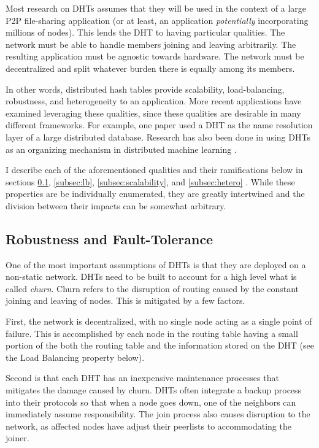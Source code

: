 \documentclass[10pt,letterpaper,twoside]{report}
\begin{document}
Most research on DHTs assumes that they will be used in the context of a large P2P file-sharing application  (or at least, an application \textit{potentially} incorporating millions of nodes).
This lends the DHT to having particular qualities.
The network must be able to handle members joining and leaving arbitrarily.
The resulting application must be agnostic towards hardware.
The network must be decentralized and split whatever burden there is equally among its members.

In other words, distributed hash tables provide scalability, load-balancing, robustness, and heterogeneity to an application.
More recent applications have examined leveraging these qualities, since these qualities are desirable in many different frameworks.
For example, one paper \cite{Mateescu2011440} used a DHT as the name resolution layer of a large distributed database.
Research has also been done in using DHTs as an organizing mechanism in distributed machine learning \cite{liparameter}. 


I describe each of the aforementioned qualities and their ramifications below in sections \ref{subsec:ft}, \ref{subsec:lb}, \ref{subsec:scalability}, and \ref{subsec:hetero} .
While these properties are  be individually enumerated, they are greatly intertwined and the division between their impacts can be somewhat arbitrary.

\subsection{Robustness and Fault-Tolerance}
\label{subsec:ft}
One of the most important assumptions of DHTs is that they are deployed on a non-static network.
DHTs need to be built to account for a high level what is called \textit{churn}.  
Churn refers to the disruption of routing caused by the constant joining and leaving of nodes.
This is mitigated by a few factors.

First, the network is decentralized, with no single node acting as a single point of failure.
This is accomplished by each node in the routing table having a small portion of the both the routing table and the information stored on the DHT (see the Load Balancing property below).

Second is that each DHT has an inexpensive maintenance processes that mitigates the damage caused by churn.
DHTs often integrate a backup process into their protocols so that when a node goes down, one of the neighbors can immediately assume responsibility.
The join process also causes disruption to the network, as affected nodes have adjust their peerlists to accommodating the joiner. 
\end{document}
